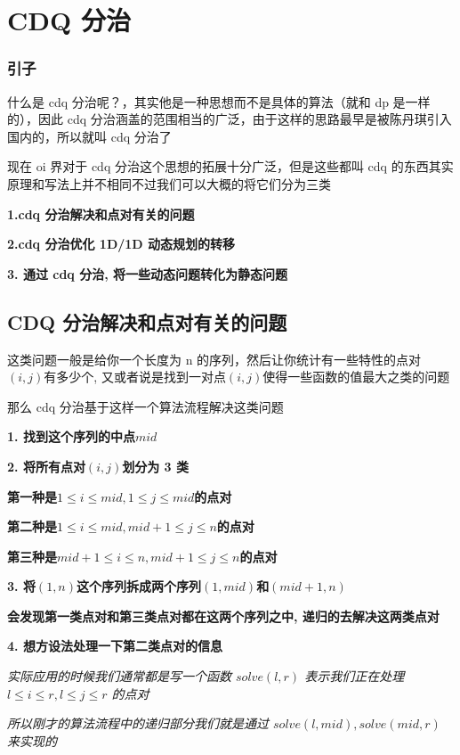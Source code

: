 
\section{CDQ 分治}

\subsubsection{引子}

什么是 cdq 分治呢？，其实他是一种思想而不是具体的算法（就和 dp 是一样的），因此 cdq 分治涵盖的范围相当的广泛，由于这样的思路最早是被陈丹琪引入国内的，所以就叫 cdq 分治了

现在 oi 界对于 cdq 分治这个思想的拓展十分广泛，但是这些都叫 cdq 的东西其实原理和写法上并不相同不过我们可以大概的将它们分为三类

\textbf{1.cdq 分治解决和点对有关的问题}

\textbf{2.cdq 分治优化 1D/1D 动态规划的转移}

\textbf{3. 通过 cdq 分治, 将一些动态问题转化为静态问题}

\hr

\subsection{CDQ 分治解决和点对有关的问题}

这类问题一般是给你一个长度为 n 的序列，然后让你统计有一些特性的点对$(i,j)$有多少个, 又或者说是找到一对点$(i,j)$使得一些函数的值最大之类的问题

那么 cdq 分治基于这样一个算法流程解决这类问题

\textbf{1. 找到这个序列的中点$mid$}

\textbf{2. 将所有点对$(i,j)$划分为 3 类}

\textbf{第一种是$1 \leq i \leq mid,1 \leq j \leq mid$的点对}

\textbf{第二种是$1  \leq i \leq mid ,mid+1 \leq j \leq n$的点对}

\textbf{第三种是$mid+1 \leq  i \leq n,mid+1 \leq j \leq n$的点对}

\textbf{3. 将$(1,n)$这个序列拆成两个序列$(1,mid)$和$(mid+1,n)$}

\textbf{会发现第一类点对和第三类点对都在这两个序列之中, 递归的去解决这两类点对}

\textbf{4. 想方设法处理一下第二类点对的信息}

{\em 实际应用的时候我们通常都是写一个函数 $solve(l,r)$ 表示我们正在处理 $l \leq i \leq r,l \leq j \leq r$ 的点对 }

{\em 所以刚才的算法流程中的递归部分我们就是通过 $solve(l,mid),solve(mid,r)$ 来实现的 }


